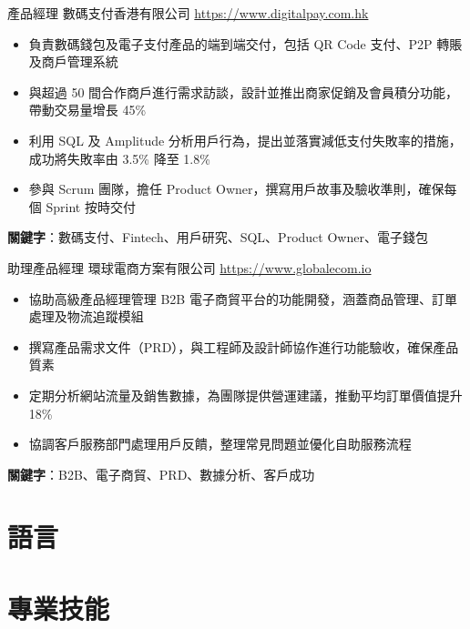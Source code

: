 \documentclass[a4paper, serif, 10pt]{moderncv}
\begin{document}
        {產品經理}
        {數碼支付香港有限公司}
        {\url{https://www.digitalpay.com.hk}}
        {}
        {\begin{itemize}
\item 負責數碼錢包及電子支付產品的端到端交付，包括 QR Code 支付、P2P 轉賬及商戶管理系統
\item 與超過 50 間合作商戶進行需求訪談，設計並推出商家促銷及會員積分功能，帶動交易量增長 45\%
\item 利用 SQL 及 Amplitude 分析用戶行為，提出並落實減低支付失敗率的措施，成功將失敗率由 3.5\% 降至 1.8\%
\item 參與 Scrum 團隊，擔任 Product Owner，撰寫用戶故事及驗收準則，確保每個 Sprint 按時交付
\end{itemize}
\textbf{關鍵字}：數碼支付、Fintech、用戶研究、SQL、Product Owner、電子錢包}

        {助理產品經理}
        {環球電商方案有限公司}
        {\url{https://www.globalecom.io}}
        {}
        {\begin{itemize}
\item 協助高級產品經理管理 B2B 電子商貿平台的功能開發，涵蓋商品管理、訂單處理及物流追蹤模組
\item 撰寫產品需求文件（PRD），與工程師及設計師協作進行功能驗收，確保產品質素
\item 定期分析網站流量及銷售數據，為團隊提供營運建議，推動平均訂單價值提升 18\%
\item 協調客戶服務部門處理用戶反饋，整理常見問題並優化自助服務流程
\end{itemize}
\textbf{關鍵字}：B2B、電子商貿、PRD、數據分析、客戶成功}
\section{語言}

\section{專業技能}

\end{document}
